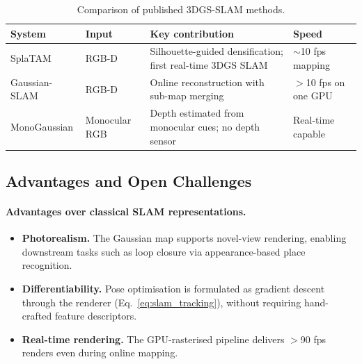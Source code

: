 \begin{table}[H]
  \centering
  \caption{Comparison of published 3DGS-SLAM methods.}
  \label{tab:slam_systems}
  \renewcommand{\arraystretch}{1.4}
  \begin{tabular}{l p{3.2cm} p{4.0cm} p{3.5cm}}
    \toprule
    \textbf{System} & \textbf{Input} & \textbf{Key contribution} & \textbf{Speed} \\
    \midrule
    SplaTAM~\cite{keetha2024splatam} &
      RGB-D &
      Silhouette-guided densification; first real-time 3DGS SLAM &
      $\sim$10 fps mapping \\
    Gaussian-SLAM &
      RGB-D &
      Online reconstruction with sub-map merging &
      $>$10 fps on one GPU \\
    MonoGaussian &
      Monocular RGB &
      Depth estimated from monocular cues; no depth sensor &
      Real-time capable \\
    \bottomrule
  \end{tabular}
\end{table}

\subsection{Advantages and Open Challenges}

\paragraph{Advantages over classical SLAM representations.}
\begin{itemize}
  \item \textbf{Photorealism.}  The Gaussian map supports novel-view rendering,
        enabling downstream tasks such as loop closure via appearance-based
        place recognition.
  \item \textbf{Differentiability.}  Pose optimisation is formulated as gradient
        descent through the renderer (Eq.~\ref{eq:slam_tracking}), without
        requiring hand-crafted feature descriptors.
  \item \textbf{Real-time rendering.}  The GPU-rasterised pipeline delivers
        $>$90 fps renders even during online mapping.
\end{itemize}

